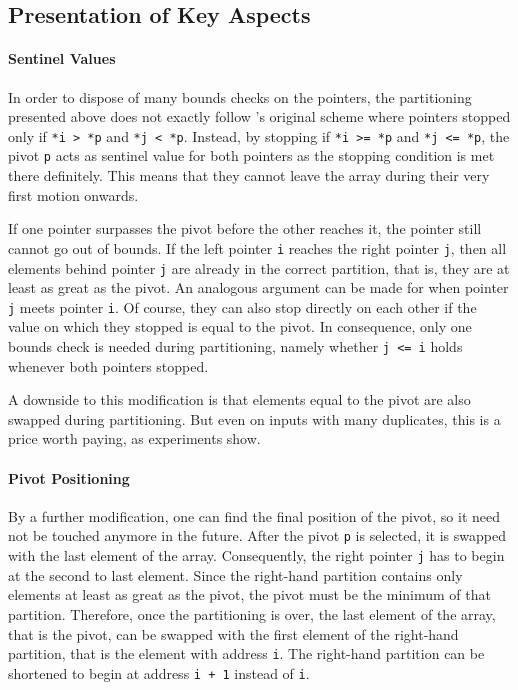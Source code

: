 \subsection{Presentation of Key Aspects}
\label{sec:tasklet:quick:aspects}

\paragraph{Sentinel Values}
\label{sec:tasklet:quick:imp:sentinels}
In order to dispose of many bounds checks on the pointers, the partitioning presented above does not exactly follow \citeauthor{hoare1962quicksort}'s original scheme where pointers stopped only if \lstinline|*i > *p| and \lstinline|*j < *p|.
Instead, by stopping if \lstinline|*i >= *p| and \lstinline|*j <= *p|, the pivot \lstinline|p| acts as sentinel value for both pointers as the stopping condition is met there definitely.
This means that they cannot leave the array during their very first motion onwards.

If one pointer surpasses the pivot before the other reaches it, the pointer still cannot go out of bounds.
If the left pointer \lstinline|i| reaches the right pointer \lstinline|j|, then all elements behind pointer \lstinline|j| are already in the correct partition, that is, they are at least as great as the pivot.
An analogous argument can be made for when pointer \lstinline|j| meets pointer \lstinline|i|.
Of course, they can also stop directly on each other if the value on which they stopped is equal to the pivot.
In consequence, only one bounds check is needed during partitioning, namely whether \lstinline|j <= i| holds whenever both pointers stopped.

A downside to this modification is that elements equal to the pivot are also swapped during partitioning.
But even on inputs with many duplicates, this is a price worth paying, as experiments show.


\paragraph{Pivot Positioning}
By a further modification, one can find the final position of the pivot, so it need not be touched anymore in the future.
After the pivot \lstinline|p| is selected, it is swapped with the last element of the array.
Consequently, the right pointer \lstinline|j| has to begin at the second to last element.
Since the right-hand partition contains only elements at least as great as the pivot, the pivot must be the minimum of that partition.
Therefore, once the partitioning is over, the last element of the array, that is the pivot, can be swapped with the first element of the right-hand partition, that is the element with address \lstinline|i|.
The right-hand partition can be shortened to begin at address \lstinline|i + 1| instead of \lstinline|i|.


